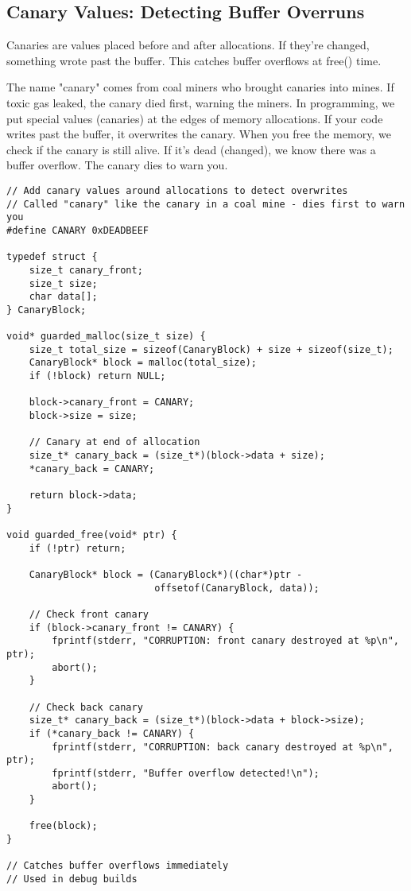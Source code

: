 \subsection{Canary Values: Detecting Buffer Overruns}

Canaries are values placed before and after allocations. If they're changed, something wrote past the buffer. This catches buffer overflows at free() time.

The name "canary" comes from coal miners who brought canaries into mines. If toxic gas leaked, the canary died first, warning the miners. In programming, we put special values (canaries) at the edges of memory allocations. If your code writes past the buffer, it overwrites the canary. When you free the memory, we check if the canary is still alive. If it's dead (changed), we know there was a buffer overflow. The canary dies to warn you.

\begin{lstlisting}
// Add canary values around allocations to detect overwrites
// Called "canary" like the canary in a coal mine - dies first to warn you
#define CANARY 0xDEADBEEF

typedef struct {
    size_t canary_front;
    size_t size;
    char data[];
} CanaryBlock;

void* guarded_malloc(size_t size) {
    size_t total_size = sizeof(CanaryBlock) + size + sizeof(size_t);
    CanaryBlock* block = malloc(total_size);
    if (!block) return NULL;

    block->canary_front = CANARY;
    block->size = size;

    // Canary at end of allocation
    size_t* canary_back = (size_t*)(block->data + size);
    *canary_back = CANARY;

    return block->data;
}

void guarded_free(void* ptr) {
    if (!ptr) return;

    CanaryBlock* block = (CanaryBlock*)((char*)ptr -
                          offsetof(CanaryBlock, data));

    // Check front canary
    if (block->canary_front != CANARY) {
        fprintf(stderr, "CORRUPTION: front canary destroyed at %p\n", ptr);
        abort();
    }

    // Check back canary
    size_t* canary_back = (size_t*)(block->data + block->size);
    if (*canary_back != CANARY) {
        fprintf(stderr, "CORRUPTION: back canary destroyed at %p\n", ptr);
        fprintf(stderr, "Buffer overflow detected!\n");
        abort();
    }

    free(block);
}

// Catches buffer overflows immediately
// Used in debug builds
\end{lstlisting}

